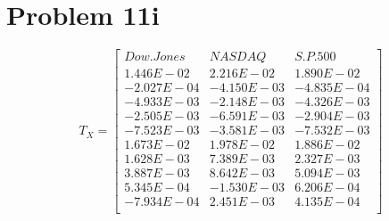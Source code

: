 \documentclass{article}
\begin{document}
\section*{Problem 11i}
\begin{equation*}
T_X = 
\begin{bmatrix}{}
 Dow.Jones & NASDAQ & S.P.500 \\ 
 1.446E-02 & 2.216E-02 & 1.890E-02 \\ 
  -2.027E-04 & -4.150E-03 & -4.835E-04 \\ 
  -4.933E-03 & -2.148E-03 & -4.326E-03 \\ 
  -2.505E-03 & -6.591E-03 & -2.904E-03 \\ 
  -7.523E-03 & -3.581E-03 & -7.532E-03 \\ 
  1.673E-02 & 1.978E-02 & 1.886E-02 \\ 
  1.628E-03 & 7.389E-03 & 2.327E-03 \\ 
  3.887E-03 & 8.642E-03 & 5.094E-03 \\ 
  5.345E-04 & -1.530E-03 & 6.206E-04 \\ 
  -7.934E-04 & 2.451E-03 & 4.135E-04 \\ 
  \end{bmatrix}
\end{equation*}
\end{document}
